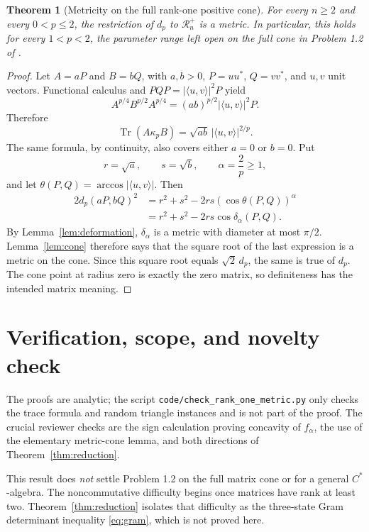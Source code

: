 \documentclass[11pt]{article}
\newtheorem{theorem}{Theorem}
\newcommand{\Tr}{\operatorname{Tr}}
\begin{document}
\begin{theorem}[Metricity on the full rank-one positive cone]
For every $n\geq2$ and every $0<p\leq2$, the restriction of $d_p$ to
$\mathcal R_n^+$ is a metric.  In particular, this holds for every
$1<p<2$, the parameter range left open on the full cone in Problem 1.2 of
\cite{Zhang}.
\end{theorem}

\begin{proof}
Let $A=aP$ and $B=bQ$, with $a,b>0$, $P=uu^*$, $Q=vv^*$, and $u,v$ unit
vectors.  Functional calculus and $PQP=|\langle u,v\rangle|^2P$ yield
\[
 A^{p/4}B^{p/2}A^{p/4}
  =(ab)^{p/2}|\langle u,v\rangle|^2P.
\]
Therefore
\[
 \Tr(A\mathbin{\kappa_p}B)
  =\sqrt{ab}\,|\langle u,v\rangle|^{2/p}.
\]
The same formula, by continuity, also covers either $a=0$ or $b=0$.
Put
\[
 r=\sqrt a,\qquad s=\sqrt b,\qquad
 \alpha=\frac2p\geq1,
\]
and let $\theta(P,Q)=\arccos|\langle u,v\rangle|$.  Then
\begin{align*}
 2d_p(aP,bQ)^2
 &=r^2+s^2-2rs(\cos\theta(P,Q))^\alpha\\
 &=r^2+s^2-2rs\cos\delta_\alpha(P,Q).
\end{align*}
By Lemma~\ref{lem:deformation}, $\delta_\alpha$ is a metric with diameter at
most $\pi/2$.  Lemma~\ref{lem:cone} therefore says that the square root of the
last expression is a metric on the cone.  Since this square root equals
$\sqrt2\,d_p$, the same is true of $d_p$.  The cone point at radius zero is
exactly the zero matrix, so definiteness has the intended matrix meaning.
\end{proof}

\section*{Verification, scope, and novelty check}

The proofs are analytic; the script \texttt{code/check\_rank\_one\_metric.py}
only checks the trace formula and random triangle instances and is not part of
the proof.  The crucial reviewer checks are the sign calculation proving
concavity of $f_\alpha$, the use of the elementary metric-cone lemma, and both
directions of Theorem~\ref{thm:reduction}.

This result does \emph{not} settle Problem 1.2 on the full matrix cone or for a
general $C^*$-algebra.  The noncommutative difficulty begins once matrices have
rank at least two.  Theorem~\ref{thm:reduction} isolates that difficulty as the
three-state Gram determinant inequality \eqref{eq:gram}, which is not proved
here.
\end{document}
